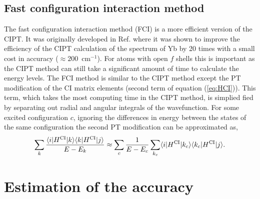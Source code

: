 \documentclass[10pt,a4paper, twoside, openright]{report}
\begin{document}
\subsection{Fast configuration interaction method}
The fast configuration interaction method (FCI) is a more efficient version of the CIPT. It was originally developed in Ref. \cite{FCI} where it was shown to improve the efficiency of the CIPT calculation of the spectrum of Yb by 20 times with a small cost in accuracy ($\approx 200$~cm$^{-1}$). For atoms with open $f$ shells this is important as the CIPT method can still take a significant amount of time to calculate the energy levels. The FCI method is similar to the CIPT method except the PT modification of the CI matrix elements (second term of equation (\ref{eq:HCI})). This term, which takes the most computing time in the CIPT method, is simplied fied by separating out radial and angular integrals of the wavefunction. For some excited configuration $c$, ignoring the differences in energy between the states of the same configuration the second PT modification can be approximated as,
\begin{align}
\sum_k \frac{\langle i|H^{\rm CI}|k\rangle\langle k|H^{\rm
    CI}|j\rangle}{E - E_k} \approx \sum_{c}\dfrac{1}{E - E_c}\sum_{k_c}\langle i|H^{\rm CI}|k_c\rangle\langle k_c|H^{\rm
    CI}|j\rangle.
\end{align}
\fi
\section{Estimation of the accuracy} \label{sec:Accuracy}
\end{document}
